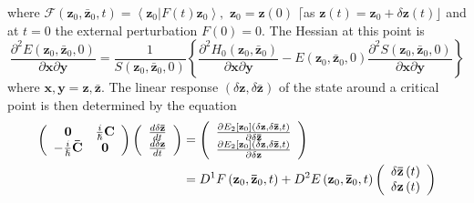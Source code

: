 \documentclass[aps,preprint]{revtex4}%
\begin{document}
where $\mathcal{F}\left(  \mathbf{z}_{0},\mathbf{\bar{z}}_{0},t\right)
=\left\langle \left.  \mathbf{z}_{0}\right\vert F\left(  t\right)
\mathbf{z}_{0}\right\rangle ,$ $\mathbf{z}_{0}=\mathbf{z}\left(  0\right)  $
$\lceil$as $\mathbf{z}\left(  t\right)  =\mathbf{z}_{0}+\delta\mathbf{z}%
\left(  t\right)  \rfloor$ and at $t=0$ the external perturbation $F\left(
0\right)  =0$. The Hessian at this point is
\begin{equation}
\frac{\partial^{2}E\left(  \mathbf{z}_{0},\mathbf{\bar{z}}_{0},0\right)
}{\partial\mathbf{x}\partial\mathbf{y}}=\frac{1}{S\left(  \mathbf{z}%
_{0},\mathbf{\bar{z}}_{0},0\right)  }\left\{  \frac{\partial^{2}H_{0}\left(
\mathbf{z}_{0},\mathbf{\bar{z}}_{0}\right)  }{\partial\mathbf{x}%
\partial\mathbf{y}}-E\left(  \mathbf{z}_{0},\mathbf{\bar{z}}_{0},0\right)
\frac{\partial^{2}S\left(  \mathbf{z}_{0},\mathbf{\bar{z}}_{0},0\right)
}{\partial\mathbf{x}\partial\mathbf{y}}\right\}
\end{equation}
where $\mathbf{x},\mathbf{y=z},\mathbf{\bar{z}.}$ The linear response $\left(
\delta\mathbf{z},\delta\mathbf{\bar{z}}\right)  $ of the state around a
critical point is then determined by the equation
\begin{align}
\left(
\begin{array}
[c]{cc}%
\mathbf{0} & \frac{i}{\hslash}\mathbf{C}\\
-\frac{i}{\hslash}\mathbf{\bar{C}} & \mathbf{0}%
\end{array}
\right)  \left(
\begin{array}
[c]{c}%
\frac{d\delta\mathbf{\bar{z}}}{dt}\\
\frac{d\delta\mathbf{z}}{dt}%
\end{array}
\right)   &  =\left(
\begin{array}
[c]{c}%
\frac{\partial E_{2}\left[  \mathbf{z}_{0}\right]  \left(  \delta
\mathbf{z},\delta\mathbf{\bar{z}},t\right)  }{\partial\delta\mathbf{\bar{z}}%
}\\
\frac{\partial E_{2}\left[  \mathbf{z}_{0}\right]  \left(  \delta
\mathbf{z},\delta\mathbf{\bar{z}},t\right)  }{\partial\delta\mathbf{z}}%
\end{array}
\right) \nonumber\\
&  =D^{1}F\left(  \mathbf{z}_{0},\mathbf{\bar{z}}_{0},t\right)  +D^{2}E\left(
\mathbf{z}_{0},\mathbf{\bar{z}}_{0},t\right)  \left(
\begin{array}
[c]{c}%
\delta\mathbf{\bar{z}}\left(  t\right) \\
\delta\mathbf{z}\left(  t\right)
\end{array}
\right)
\end{align}
\end{document}
